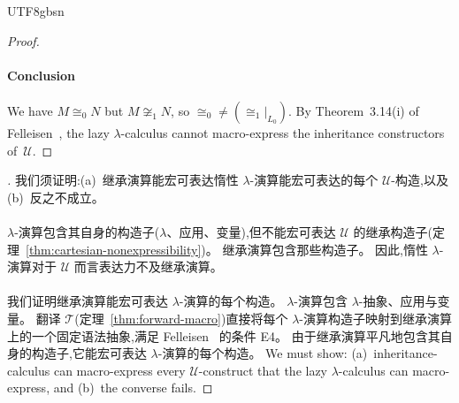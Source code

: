 \begin{CJK*}{UTF8}{gbsn}
\begin{proof}
  \paragraph{Conclusion}
  \begin{sloppypar}
  We have $M \cong_0 N$ but $M \not\cong_1 N$, so
  ${\cong_0} \neq {(\cong_1|_{L_0})}$.
  By Theorem~3.14(i) of
  Felleisen~\cite{felleisen1991-expressive-power},
  the lazy $\lambda$-calculus cannot macro-express the
  inheritance constructors of~$\mathscr{U}$.
  \end{sloppypar}
  \fi
\end{proof}



\begin{proof}[]
  \ifPaperChinese
  我们须证明:(a)~继承演算能宏可表达惰性 $\lambda$-演算能宏可表达的每个 $\mathscr{U}$-构造,以及 (b)~反之不成立。

  \paragraph{}
  $\lambda$-演算包含其自身的构造子($\lambda$、应用、变量),但不能宏可表达 $\mathscr{U}$ 的继承构造子(定理~\ref{thm:cartesian-nonexpressibility})。
  继承演算包含那些构造子。
  因此,惰性 $\lambda$-演算对于 $\mathscr{U}$ 而言表达力不及继承演算。

  \paragraph{}
  我们证明继承演算能宏可表达 $\lambda$-演算的每个构造。
  $\lambda$-演算包含 $\lambda$-抽象、应用与变量。
  翻译 $\mathcal{T}$(定理~\ref{thm:forward-macro})直接将每个 $\lambda$-演算构造子映射到继承演算上的一个固定语法抽象,满足 Felleisen~\cite[Definition~3.11]{felleisen1991-expressive-power} 的条件 E4。
  由于继承演算平凡地包含其自身的构造子,它能宏可表达 $\lambda$-演算的每个构造。
  \else
  We must show:
  (a)~inheritance-calculus can macro-express every
  $\mathscr{U}$-construct that the lazy $\lambda$-calculus
  can macro-express, and
  (b)~the converse fails.


\end{proof}
\end{CJK*}
